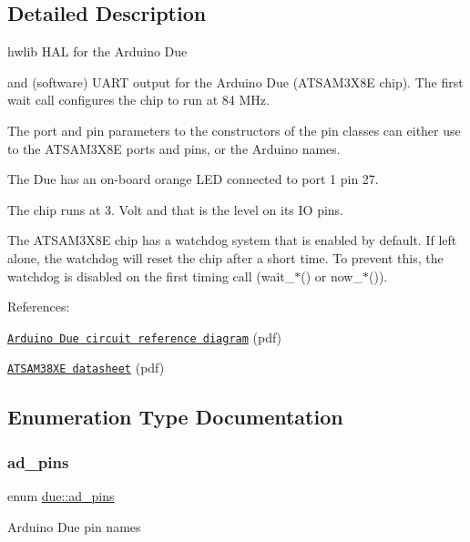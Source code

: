 \subsection{Detailed Description}
hwlib H\+AL for the Arduino Due 

 and (software) U\+A\+RT output for the Arduino Due (A\+T\+S\+A\+M3\+X8E chip). The first wait call configures the chip to run at 84 M\+Hz.

The port and pin parameters to the constructors of the pin classes can either use to the A\+T\+S\+A\+M3\+X8E ports and pins, or the Arduino names.

The Due has an on-\/board orange L\+ED connected to port 1 pin 27.

The chip runs at 3. Volt and that is the level on its IO pins.



The A\+T\+S\+A\+M3\+X8E chip has a watchdog system that is enabled by default. If left alone, the watchdog will reset the chip after a short time. To prevent this, the watchdog is disabled on the first timing call (wait\+\_\+$\ast$() or now\+\_\+$\ast$()).

References\+:
\begin{DoxyItemize}
\item \href{https://www.arduino.cc/en/uploads/Main/arduino-uno-schematic.pdf}{\tt Arduino Due circuit reference diagram} (pdf)
\item \href{http://www.atmel.com/ru/ru/Images/Atmel-11057-32-bit-Cortex-M3-Microcontroller-SAM3X-SAM3A_Datasheet.pdf}{\tt A\+T\+S\+A\+M38\+XE datasheet} (pdf) 
\end{DoxyItemize}

\subsection{Enumeration Type Documentation}
\mbox{\label{namespacedue_a5ecc98d40585c91eabbfb14f71bd7d4c}} 
\subsubsection{\texorpdfstring{ad\+\_\+pins}{ad\_pins}}
{\footnotesize\ttfamily enum \hyperlink{namespacedue_a5ecc98d40585c91eabbfb14f71bd7d4c}{due\+::ad\+\_\+pins}\hspace{0.3cm}{\ttfamily [strong]}}

Arduino Due pin names

